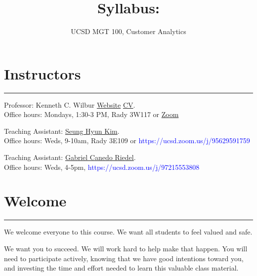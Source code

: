 \documentclass[12pt]{article}
\title{\vspace{-1cm}Syllabus:\vspace{-0.3cm}}
\author{\vspace{-0.5cm}UCSD MGT 100, Customer Analytics}
\begin{document}
\maketitle



\section*{Instructors}
\medskip
\hrule
\medskip


Professor: Kenneth C. Wilbur \textcolor{blue}{\href{http://kennethcwilbur.com/}{Website} \href{https://github.com/kennethcwilbur/website/raw/master/kennethcwilbur_cv.pdf}{CV}}. \\Office hours: Mondays, 1:30-3 PM, Rady 3W117 or \textcolor{blue}{\href{https://ucsd.zoom.us/j/9477848814}{Zoom}}
\vspace{0.2cm}

Teaching Assistant: \textcolor{blue}{\href{https://seunghyun-kim.com/}{Seung Hyun Kim}}.
\\Office hours: Weds, 9-10am, Rady 3E109 or \textcolor{blue}{https://ucsd.zoom.us/j/95629591759}
\vspace{0.2cm}

Teaching Assistant: \textcolor{blue}{\href{https://www.linkedin.com/in/gabriel-ca\%C3\%B1edo-riedel-612443147/}{Gabriel Canedo Riedel}}. 
\\Office hours: Weds, 4-5pm, \textcolor{blue}{https://ucsd.zoom.us/j/97215553808}
\vspace{0.2cm}

\section*{Welcome}
\medskip
\hrule
\medskip
We welcome everyone to this course. We want all students to feel valued and safe. 

We want you to succeed. We will work hard to help make that happen. You will need to participate actively, knowing that we have good intentions toward you, and investing the time and effort needed to learn this valuable class material.
\end{document}
